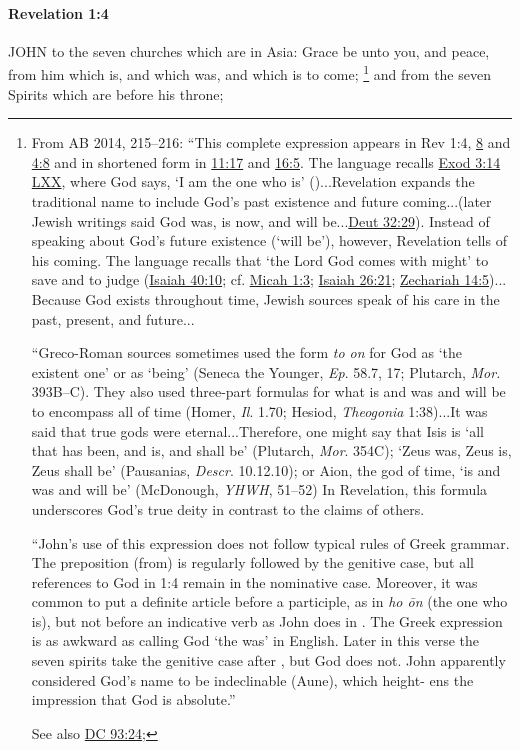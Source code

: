 		\paragraph{Revelation 1:4} %
			\label{REVELATIONNT-1-4}

			JOHN to the seven churches which are in Asia: Grace be unto you, and peace, from him which is, and which was, and which is to come;%
				\footnote{%
					From AB 2014, 215--216: ``This complete expression appears in Rev 1:4, \hyperref[REVELATIONNT-1-8]{8} and \hyperref[REVELATIONNT-4-8]{4:8} and in shortened form in \hyperref[REVELATIONNT-11-17]{11:17} and \hyperref[REVELATIONNT-16-5]{16:5}. The language recalls \hyperref[EXODUS-3-14]{Exod 3:14 LXX}, where God says, `I am the one who is' ()...Revelation expands the traditional name to include God's past existence and future coming...(later Jewish writings said God was, is now, and will be...\hyperref[DEUTERONOMY-32-39]{Deut 32:29}). Instead of speaking about God's future existence (`will be'), however, Revelation tells of his coming. The language recalls that `the Lord God comes with might' to save and to judge (\hyperref[ISAIAH-40-10]{Isaiah 40:10}; cf. \hyperref[MICAH-1-3]{Micah 1:3}; \hyperref[ISAIAH-26-21]{Isaiah 26:21}; \hyperref[ZECHARIAH-14-5]{Zechariah 14:5})... Because God exists throughout time, Jewish sources speak of his care in the past, present, and future...
					
					``Greco-Roman sources sometimes used the form \textit{to on} for God as `the existent one' or as `being' (Seneca the Younger, \textit{Ep}. 58.7, 17; Plutarch, \textit{Mor.} 393B--C). They also used three-part formulas for what is and was and will be to encompass all of time (Homer, \textit{Il}. 1.70; Hesiod, \textit{Theogonia} 1:38)...It was said that true gods were eternal...Therefore, one might say that Isis is `all that has been, and is, and shall be' (Plutarch, \textit{Mor}. 354C); `Zeus was, Zeus is, Zeus shall be' (Pausanias, \textit{Descr}. 10.12.10); or Aion, the god of time, `is and was and will be' (McDonough, \textit{YHWH}, 51--52) In Revelation, this formula underscores God's true deity in contrast to the claims of others.

					``John's use of this expression does not follow typical rules of Greek grammar. The preposition  (from) is regularly followed by the genitive case, but all references to God in 1:4 remain in the nominative case. Moreover, it was common to put a definite article before a participle, as in \textit{ho \={o}n} (the one who is), but not before an indicative verb as John does in . The Greek expression is as awkward as calling God `the was' in English. Later in this verse the seven spirits take the genitive case after , but God does not. John apparently considered God's name to be indeclinable (Aune), which height- ens the impression that God is absolute.''
					
					See also \hyperref[DC93-24]{DC 93:24}; 
					}
			and from the seven Spirits which are before his throne;


